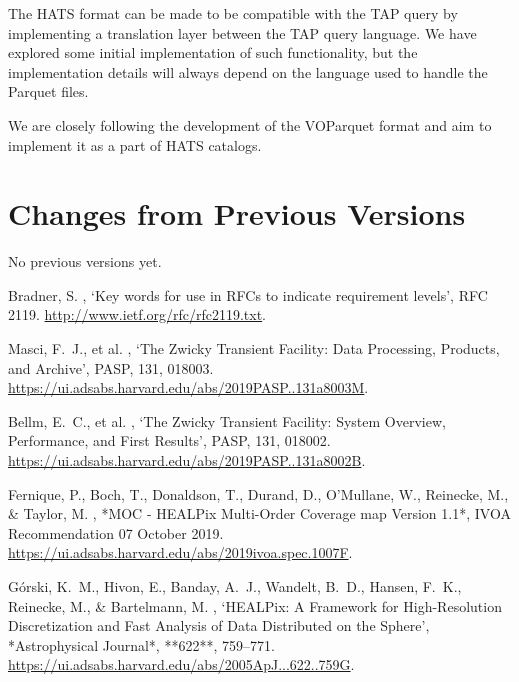 \documentclass[11pt,a4paper]{ivoa}
\begin{document}
The HATS format can be made to be compatible with the TAP query by implementing a translation layer between the TAP query language. 
We have explored some initial implementation of such functionality, but the implementation details will always depend on the language used to handle the Parquet files. \par

We are closely following the development of the VOParquet format and aim to implement it as a part of HATS catalogs.

\appendix
\section{Changes from Previous Versions}
No previous versions yet.

% 
\begin{thebibliography}{}

Bradner, S.  \harvardyearright , `Key words for use in
  {RFCs} to indicate requirement levels', RFC 2119.
\newblock \url{http://www.ietf.org/rfc/rfc2119.txt}.

Masci, F.~J., et al. \harvardyearright,
`The Zwicky Transient Facility: Data Processing, Products, and Archive',
PASP, 131, 018003. \url{https://ui.adsabs.harvard.edu/abs/2019PASP..131a8003M}.

Bellm, E.~C., et al. \harvardyearright,
`The Zwicky Transient Facility: System Overview, Performance, and First Results',
PASP, 131, 018002. \url{https://ui.adsabs.harvard.edu/abs/2019PASP..131a8002B}.

Fernique, P., Boch, T., Donaldson, T., Durand, D., O'Mullane, W., Reinecke, M., \& Taylor, M.  
\harvardyearright,  
*MOC - HEALPix Multi-Order Coverage map Version 1.1*,  
IVOA Recommendation 07 October 2019.  
\url{https://ui.adsabs.harvard.edu/abs/2019ivoa.spec.1007F}.

G{\'o}rski, K.~M., Hivon, E., Banday, A.~J., Wandelt, B.~D., Hansen, F.~K., Reinecke, M., \& Bartelmann, M.  
\harvardyearright,  
`HEALPix: A Framework for High-Resolution Discretization and Fast Analysis of Data Distributed on the Sphere',  
*Astrophysical Journal*, **622**, 759–771.  
\url{https://ui.adsabs.harvard.edu/abs/2005ApJ...622..759G}.

\end{thebibliography}
\end{document}
